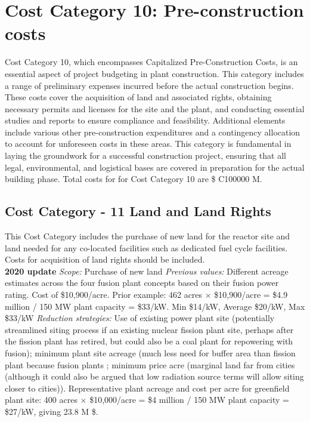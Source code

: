 \section{Cost Category 10: Pre-construction costs} 

Cost Category 10, which encompasses Capitalized Pre-Construction Costs, is an essential aspect of project budgeting in plant construction. This category includes a range of preliminary expenses incurred before the actual construction begins. These costs cover the acquisition of land and associated rights, obtaining necessary permits and licenses for the site and the plant, and conducting essential studies and reports to ensure compliance and feasibility. Additional elements include various other pre-construction expenditures and a contingency allocation to account for unforeseen costs in these areas. This category is fundamental in laying the groundwork for a successful construction project, ensuring that all legal, environmental, and logistical bases are covered in preparation for the actual building phase.  Total costs for for Cost Category 10 are \$ C100000 M.

\subsection*{Cost Category - 11 Land and Land Rights}
This Cost Category includes the purchase of new land for the reactor site and land needed for any co-located facilities such as dedicated fuel cycle facilities.  Costs for acquisition of land rights should be included. \\

 \textbf{2020 update} 
\emph{Scope: }Purchase of new land 
 \emph{Previous values: } 
Different acreage estimates across the four fusion plant concepts based on their fusion power rating. Cost of \$10,900/acre. 
Prior example: 462 acres $\times$ \$10,900/acre = \$4.9 million / 150 MW plant capacity =  \$33/kW.  Min \$14/kW, Average \$20/kW, Max \$33/kW  
 \emph{Reduction strategies: } 
 Use of existing power plant site (potentially streamlined siting process if an existing nuclear fission plant site, perhaps after the fission plant has retired, but could also be a coal plant for repowering with fusion); minimum plant site acreage (much less need for buffer area than fission plant because fusion plants ; minimum price acre (marginal land far from cities (although it could also be argued that low radiation source terms will allow siting closer to cities)). 
Representative plant acreage and cost per acre for greenfield plant site: 400 acres $\times$ \$10,000/acre = \$4 million / 150 MW plant capacity = \$27/kW, giving 23.8 M \$.  \\

